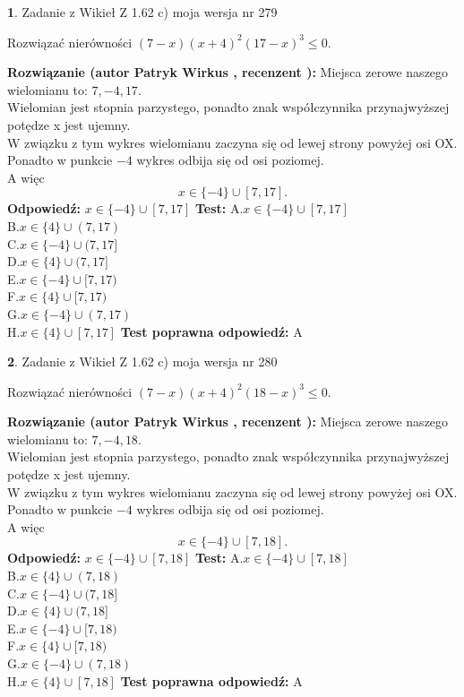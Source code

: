 \documentclass[12pt, a4paper]{article}
\theoremstyle{definition} %
\newtheorem{zad}{}
\newcommand{\zadStart}[1]{\begin{zad}#1\newline}
\newcommand{\zadStop}{\end{zad}}
\newcommand{\rozwStart}[2]{\noindent \textbf{Rozwiązanie (autor #1 , recenzent #2): }\newline}
\newcommand{\rozwStop}{\newline}
\newcommand{\odpStart}{\noindent \textbf{Odpowiedź:}\newline}
\newcommand{\odpStop}{\newline}
\newcommand{\testStart}{\noindent \textbf{Test:}\newline}
\newcommand{\testStop}{\newline}
\newcommand{\kluczStart}{\noindent \textbf{Test poprawna odpowiedź:}\newline}
\newcommand{\kluczStop}{\newline}
\begin{document}
\zadStart{Zadanie z Wikieł Z 1.62 c) moja wersja nr 279}

Rozwiązać nierówności $(7-x)(x+4)^{2}(17-x)^{3}\le0$.
\zadStop
\rozwStart{Patryk Wirkus}{}
Miejsca zerowe naszego wielomianu to: $7, -4, 17$.\\
Wielomian jest stopnia parzystego, ponadto znak współczynnika przy\linebreak najwyższej potędze x jest ujemny.\\ W związku z tym wykres wielomianu zaczyna się od lewej strony powyżej osi OX.\\
Ponadto w punkcie $-4$ wykres odbija się od osi poziomej.\\
A więc $$x \in \{-4\} \cup [7,17].$$
\rozwStop
\odpStart
$x \in \{-4\} \cup [7,17]$
\odpStop
\testStart
A.$x \in \{-4\} \cup [7,17]$\\
B.$x \in \{4\} \cup (7,17)$\\
C.$x \in \{-4\} \cup (7,17]$\\
D.$x \in \{4\} \cup (7,17]$\\
E.$x \in \{-4\} \cup [7,17)$\\
F.$x \in \{4\} \cup [7,17)$\\
G.$x \in \{-4\} \cup (7,17)$\\
H.$x \in \{4\} \cup [7,17]$
\testStop
\kluczStart
A
\kluczStop



\zadStart{Zadanie z Wikieł Z 1.62 c) moja wersja nr 280}

Rozwiązać nierówności $(7-x)(x+4)^{2}(18-x)^{3}\le0$.
\zadStop
\rozwStart{Patryk Wirkus}{}
Miejsca zerowe naszego wielomianu to: $7, -4, 18$.\\
Wielomian jest stopnia parzystego, ponadto znak współczynnika przy\linebreak najwyższej potędze x jest ujemny.\\ W związku z tym wykres wielomianu zaczyna się od lewej strony powyżej osi OX.\\
Ponadto w punkcie $-4$ wykres odbija się od osi poziomej.\\
A więc $$x \in \{-4\} \cup [7,18].$$
\rozwStop
\odpStart
$x \in \{-4\} \cup [7,18]$
\odpStop
\testStart
A.$x \in \{-4\} \cup [7,18]$\\
B.$x \in \{4\} \cup (7,18)$\\
C.$x \in \{-4\} \cup (7,18]$\\
D.$x \in \{4\} \cup (7,18]$\\
E.$x \in \{-4\} \cup [7,18)$\\
F.$x \in \{4\} \cup [7,18)$\\
G.$x \in \{-4\} \cup (7,18)$\\
H.$x \in \{4\} \cup [7,18]$
\testStop
\kluczStart
A
\kluczStop
\end{document}
